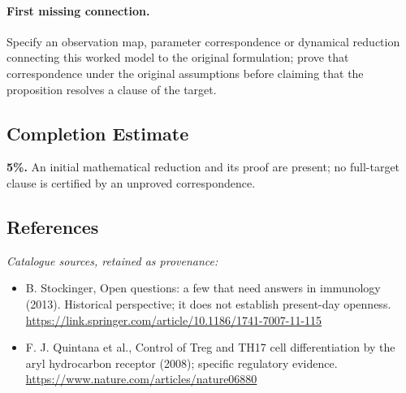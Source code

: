 \documentclass[11pt]{article}
\begin{document}
\paragraph{First missing connection.} Specify an observation map, parameter correspondence or dynamical reduction connecting this worked model to the original formulation; prove that correspondence under the original assumptions before claiming that the proposition resolves a clause of the target.
\subsection{Completion Estimate}
\textbf{5\%.} An initial mathematical reduction and its proof are present; no full-target clause is certified by an unproved correspondence.
\subsection{References}
\noindent\emph{Catalogue sources, retained as provenance:}
\begin{itemize}
\item B. Stockinger, Open questions: a few that need answers in immunology (2013). Historical perspective; it does not establish present-day openness. \url{https://link.springer.com/article/10.1186/1741-7007-11-115}
\item F. J. Quintana et al., Control of Treg and TH17 cell differentiation by the aryl hydrocarbon receptor (2008); specific regulatory evidence. \url{https://www.nature.com/articles/nature06880}
\end{itemize}
\end{document}
